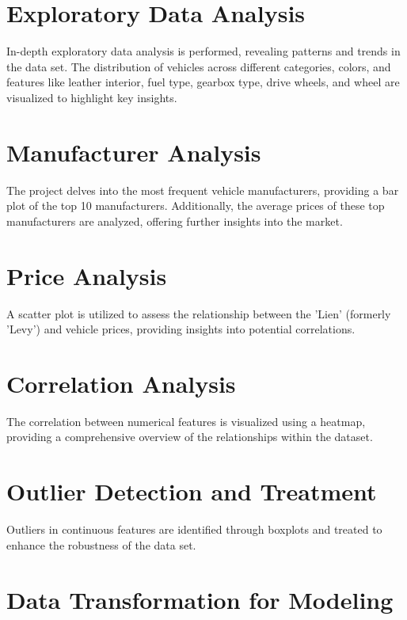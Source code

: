 \documentclass[paper=a4, fontsize=11pt,twoside]{scrartcl}
\begin{document}
\section{Exploratory Data Analysis}

In-depth exploratory data analysis is performed, revealing patterns and trends in the data set. The distribution of vehicles across different categories, colors, and features like leather interior, fuel type, gearbox type, drive wheels, and wheel are visualized to highlight key insights.

\section{Manufacturer Analysis}

The project delves into the most frequent vehicle manufacturers, providing a bar plot of the top 10 manufacturers. Additionally, the average prices of these top manufacturers are analyzed, offering further insights into the market.

\section{Price Analysis}

A scatter plot is utilized to assess the relationship between the 'Lien' (formerly 'Levy') and vehicle prices, providing insights into potential correlations.

\section{Correlation Analysis}

The correlation between numerical features is visualized using a heatmap, providing a comprehensive overview of the relationships within the dataset.

\section{Outlier Detection and Treatment}

Outliers in continuous features are identified through boxplots and treated to enhance the robustness of the data set.

\section{Data Transformation for Modeling}
\end{document}
